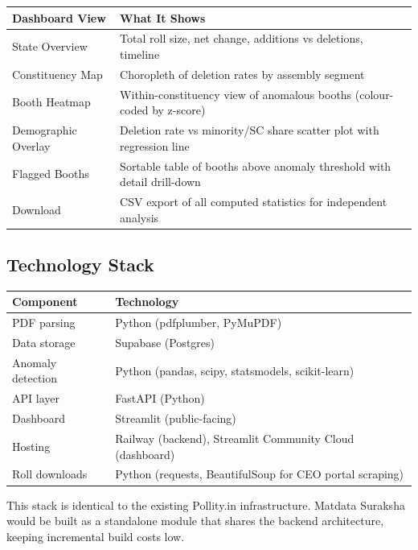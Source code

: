 \documentclass[11pt, a4paper]{article}
\begin{document}
\begin{tabularx}{\linewidth}{lX}
\toprule
\textbf{Dashboard View} & \textbf{What It Shows} \\
\midrule
State Overview      & Total roll size, net change, additions vs deletions, timeline \\
Constituency Map    & Choropleth of deletion rates by assembly segment \\
Booth Heatmap       & Within-constituency view of anomalous booths (colour-coded by z-score) \\
Demographic Overlay & Deletion rate vs minority/SC share scatter plot with regression line \\
Flagged Booths      & Sortable table of booths above anomaly threshold with detail drill-down \\
Download            & CSV export of all computed statistics for independent analysis \\
\bottomrule
\end{tabularx}

\subsection{Technology Stack}

\begin{tabularx}{\linewidth}{lX}
\toprule
\textbf{Component} & \textbf{Technology} \\
\midrule
PDF parsing         & Python (pdfplumber, PyMuPDF) \\
Data storage        & Supabase (Postgres) \\
Anomaly detection   & Python (pandas, scipy, statsmodels, scikit-learn) \\
API layer           & FastAPI (Python) \\
Dashboard           & Streamlit (public-facing) \\
Hosting             & Railway (backend), Streamlit Community Cloud (dashboard) \\
Roll downloads      & Python (requests, BeautifulSoup for CEO portal scraping) \\
\bottomrule
\end{tabularx}

\vspace{0.5em}

This stack is identical to the existing Pollity.in infrastructure. Matdata Suraksha would be built as a standalone module that shares the backend architecture, keeping incremental build costs low.
\end{document}
